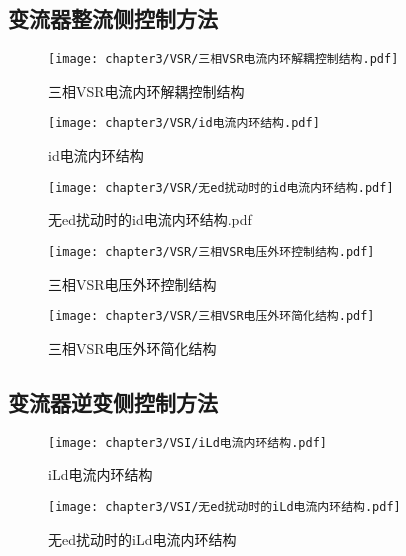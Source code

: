 \subsection{变流器整流侧控制方法}

\zhlipsum[3]

\begin{figure}[!htp]
	\centering
	\texttt{[image: chapter3/VSR/三相VSR电流内环解耦控制结构.pdf]}
	\caption{三相VSR电流内环解耦控制结构}
	\label{fig:三相VSR电流内环解耦控制结构}
\end{figure}

\begin{figure}[!htp]
	\centering
	\texttt{[image: chapter3/VSR/id电流内环结构.pdf]}
	\caption{id电流内环结构}
	\label{fig:id电流内环结构}
\end{figure}

\begin{figure}[!htp]
	\centering
	\texttt{[image: chapter3/VSR/无ed扰动时的id电流内环结构.pdf]}
	\caption{无ed扰动时的id电流内环结构.pdf}
	\label{fig:无ed扰动时的id电流内环结构.pdf}
\end{figure}

\begin{figure}[!htp]
	\centering
	\texttt{[image: chapter3/VSR/三相VSR电压外环控制结构.pdf]}
	\caption{三相VSR电压外环控制结构}
	\label{fig:三相VSR电压外环控制结构}
\end{figure}

\begin{figure}[!htp]
	\centering
	\texttt{[image: chapter3/VSR/三相VSR电压外环简化结构.pdf]}
	\caption{三相VSR电压外环简化结构}
	\label{fig:三相VSR电压外环简化结构}
\end{figure}

\subsection{变流器逆变侧控制方法}

\zhlipsum[3]

\begin{figure}[!htp]
	\centering
	\texttt{[image: chapter3/VSI/iLd电流内环结构.pdf]}
	\caption{iLd电流内环结构}
	\label{fig:iLd电流内环结构}
\end{figure}

\begin{figure}[!htp]
	\centering
	\texttt{[image: chapter3/VSI/无ed扰动时的iLd电流内环结构.pdf]}
	\caption{无ed扰动时的iLd电流内环结构}
	\label{fig:无ed扰动时的iLd电流内环结构}
\end{figure}

